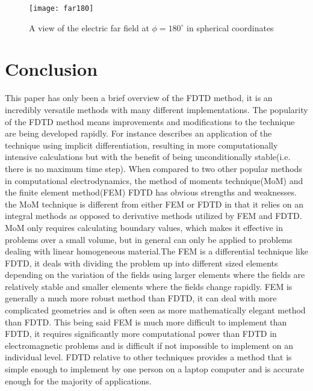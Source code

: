 \documentclass[twocolumn]{article}
\begin{document}
\begin{figure}[p,h]
\texttt{[image: far180]}
\caption{A view of the electric far field at $\phi=180^{\circ}$ in spherical coordinates}
\end{figure}

\section{Conclusion}
This paper has only been a brief overview of the FDTD method, it is an incredibly versatile methods
with many different implementations. The popularity of the FDTD method means improvements and
modifications to the technique are being developed rapidly. For instance \cite{ADI} describes an
application of the technique using implicit differentiation, resulting in more computationally
intensive calculations but with the benefit of being unconditionally stable(i.e. there is no maximum
time step). When compared to two other popular methods in computational electrodynamics, the method
of moments technique(MoM) and the finite element method(FEM) FDTD has obvious strengths and
weaknesses. the MoM technique is different from either FEM or FDTD in that it relies on an integral
methods as opposed to derivative methods utilized by FEM and FDTD. MoM only requires calculating
boundary values, which makes it effective in problems over a small volume, but in general can only be applied to
problems dealing with linear homogeneous material\cite{other}.The FEM is a differential technique like
FDTD, it deals with dividing the problem up into different sized elements depending on the
variation of the fields using larger elements where the fields are relatively stable and smaller
elements where the fields change rapidly. FEM is generally a much more robust method than FDTD, it
can deal with more complicated geometries and is often seen as more mathematically elegant method
than FDTD\cite{other}. This being said FEM is much more difficult to implement than FDTD, it
requires significantly more computational power than FDTD in electromagnetic problems and is
difficult if not impossible to implement on an individual level. FDTD relative to other techniques
provides a method that is simple enough to implement by one person on a laptop computer and is
accurate enough for the majority of applications.


\end{document}

